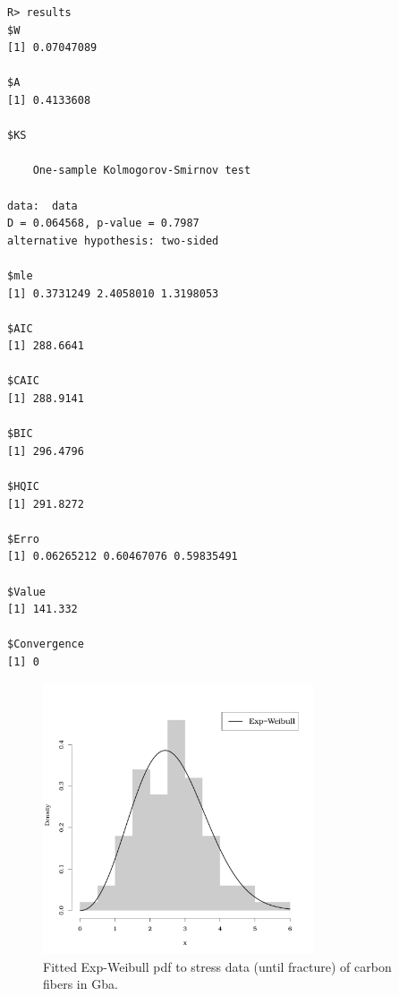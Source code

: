 \documentclass[10pt,letterpaper]{article}
\begin{document}
\begin{verbatim}
R> results
$W
[1] 0.07047089
		
$A
[1] 0.4133608
		
$KS
		
	One-sample Kolmogorov-Smirnov test
		
data:  data
D = 0.064568, p-value = 0.7987
alternative hypothesis: two-sided
		
$mle
[1] 0.3731249 2.4058010 1.3198053
		
$AIC
[1] 288.6641
		
$CAIC
[1] 288.9141
		
$BIC
[1] 296.4796
		
$HQIC
[1] 291.8272
		
$Erro
[1] 0.06265212 0.60467076 0.59835491
		
$Value
[1] 141.332
		
$Convergence
[1] 0
\end{verbatim}

\begin{figure}[H]
\centering
\includegraphics[width=8cm,height=8cm]{histogram_carbon}
\caption{Fitted Exp-Weibull pdf to stress data (until fracture) of carbon fibers in Gba.}
\label{plot_ajustament}
\end{figure}


\hspace{-0.6cm}
\end{document}
